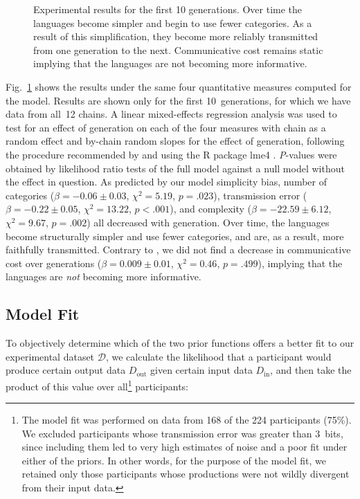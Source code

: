 \documentclass[doc,biblatex]{apa7}
\begin{document}
	\begin{figure}
	\vspace*{2pt}
	\caption{Experimental results for the first 10 generations. Over time the languages become simpler and begin to use fewer categories. As a result of this simplification, they become more reliably transmitted from one generation to the next. Communicative cost remains static implying that the languages are not becoming more informative.}
	\label{fig12}
	\end{figure}

Fig.~\ref{fig12} shows the results under the same four quantitative measures computed for the model. Results are shown only for the first 10~generations, for which we have data from all~12 chains. A linear mixed-effects regression analysis was used to test for an effect of generation on each of the four measures with chain as a random effect and by-chain random slopes for the effect of generation, following the procedure recommended by \textcite{Winter:2016} and using the R package lme4 \parencite{Bates:2015}. \textit{P}-values were obtained by likelihood ratio tests of the full model against a null model without the effect in question. As predicted by our model simplicity bias, number of categories ($\beta = -0.06 \pm 0.03$, $\chi^2 = 5.19$, $p = .023$), transmission error ($\beta = -0.22 \pm 0.05$, $\chi^2 = 13.22$, $p < .001$), and complexity ($\beta = -22.59 \pm 6.12$, $\chi^2 = 9.67$, $p = .002$) all decreased with generation. Over time, the languages become structurally simpler and use fewer categories, and are, as a result, more faithfully transmitted. Contrary to \textcite{Carstensen:2015}, we did not find a decrease in communicative cost over generations ($\beta = 0.009 \pm 0.01$, $\chi^2 = 0.46$, $p = .499$), implying that the languages are \textit{not} becoming more informative.

\subsection{Model Fit}

To objectively determine which of the two prior functions offers a better fit to our experimental dataset $\mathcal{D}$, we calculate the likelihood that a participant would produce certain output data $D_\mathrm{out}$ given certain input data $D_\mathrm{in}$, and then take the product of this value over all\footnote{The model fit was performed on data from 168 of the 224 participants (75\%). We excluded participants whose transmission error was greater than 3~bits, since including them led to very high estimates of noise and a poor fit under either of the priors. In other words, for the purpose of the model fit, we retained only those participants whose productions were not wildly divergent from their input data.} participants:
\end{document}
